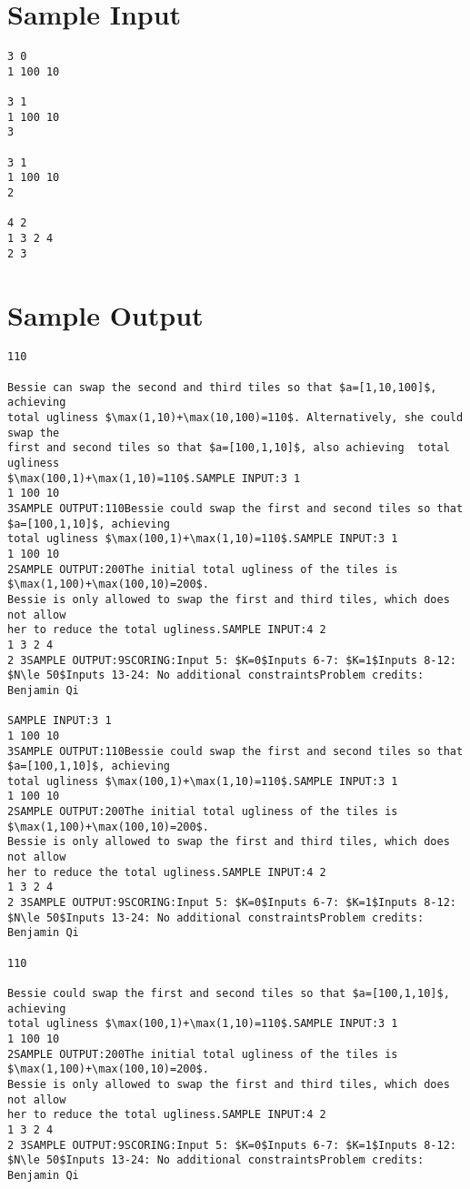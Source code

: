 \documentclass[12pt]{article}
\begin{document}
\section*{Sample Input}
\begin{verbatim}
3 0
1 100 10

3 1
1 100 10
3

3 1
1 100 10
2

4 2
1 3 2 4
2 3
\end{verbatim}

\section*{Sample Output}
\begin{verbatim}
110

Bessie can swap the second and third tiles so that $a=[1,10,100]$, achieving
total ugliness $\max(1,10)+\max(10,100)=110$. Alternatively, she could swap the
first and second tiles so that $a=[100,1,10]$, also achieving  total ugliness
$\max(100,1)+\max(1,10)=110$.SAMPLE INPUT:3 1
1 100 10
3SAMPLE OUTPUT:110Bessie could swap the first and second tiles so that $a=[100,1,10]$, achieving 
total ugliness $\max(100,1)+\max(1,10)=110$.SAMPLE INPUT:3 1
1 100 10
2SAMPLE OUTPUT:200The initial total ugliness of the tiles is $\max(1,100)+\max(100,10)=200$.
Bessie is only allowed to swap the first and third tiles, which does not allow
her to reduce the total ugliness.SAMPLE INPUT:4 2
1 3 2 4
2 3SAMPLE OUTPUT:9SCORING:Input 5: $K=0$Inputs 6-7: $K=1$Inputs 8-12: $N\le 50$Inputs 13-24: No additional constraintsProblem credits: Benjamin Qi

SAMPLE INPUT:3 1
1 100 10
3SAMPLE OUTPUT:110Bessie could swap the first and second tiles so that $a=[100,1,10]$, achieving 
total ugliness $\max(100,1)+\max(1,10)=110$.SAMPLE INPUT:3 1
1 100 10
2SAMPLE OUTPUT:200The initial total ugliness of the tiles is $\max(1,100)+\max(100,10)=200$.
Bessie is only allowed to swap the first and third tiles, which does not allow
her to reduce the total ugliness.SAMPLE INPUT:4 2
1 3 2 4
2 3SAMPLE OUTPUT:9SCORING:Input 5: $K=0$Inputs 6-7: $K=1$Inputs 8-12: $N\le 50$Inputs 13-24: No additional constraintsProblem credits: Benjamin Qi

110

Bessie could swap the first and second tiles so that $a=[100,1,10]$, achieving 
total ugliness $\max(100,1)+\max(1,10)=110$.SAMPLE INPUT:3 1
1 100 10
2SAMPLE OUTPUT:200The initial total ugliness of the tiles is $\max(1,100)+\max(100,10)=200$.
Bessie is only allowed to swap the first and third tiles, which does not allow
her to reduce the total ugliness.SAMPLE INPUT:4 2
1 3 2 4
2 3SAMPLE OUTPUT:9SCORING:Input 5: $K=0$Inputs 6-7: $K=1$Inputs 8-12: $N\le 50$Inputs 13-24: No additional constraintsProblem credits: Benjamin Qi


\end{verbatim}
\end{document}
